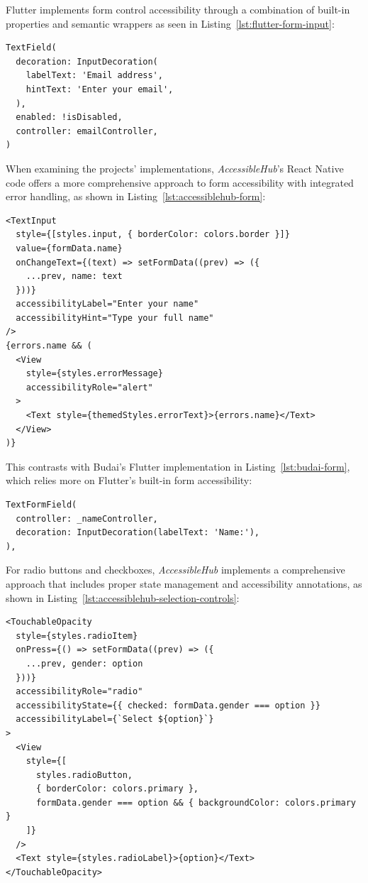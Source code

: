 Flutter implements form control accessibility through a combination of built-in properties and semantic wrappers as seen in Listing~\ref{lst:flutter-form-input}:

\begin{lstlisting}[style=DartStyle, caption=Accessible form input in Flutter, label=lst:flutter-form-input]
TextField(
  decoration: InputDecoration(
    labelText: 'Email address',
    hintText: 'Enter your email',
  ),
  enabled: !isDisabled,
  controller: emailController,
)
\end{lstlisting}

\pagebreak

When examining the projects' implementations, \textit{AccessibleHub}'s React Native code offers a more comprehensive approach to form accessibility with integrated error handling, as shown in Listing~\ref{lst:accessiblehub-form}:

\begin{lstlisting}[style=ReactNativeStyle, caption=Form implementation in AccessibleHub's React Native code, label=lst:accessiblehub-form]
<TextInput
  style={[styles.input, { borderColor: colors.border }]}
  value={formData.name}
  onChangeText={(text) => setFormData((prev) => ({
    ...prev, name: text
  }))}
  accessibilityLabel="Enter your name"
  accessibilityHint="Type your full name"
/>
{errors.name && (
  <View 
    style={styles.errorMessage} 
    accessibilityRole="alert"
  >
    <Text style={themedStyles.errorText}>{errors.name}</Text>
  </View>
)}
\end{lstlisting}

\pagebreak

This contrasts with Budai's Flutter implementation in Listing~\ref{lst:budai-form}, which relies more on Flutter's built-in form accessibility:

\begin{lstlisting}[style=DartStyle, caption=Form implementation in Budai's Flutter code, label=lst:budai-form]
TextFormField(
  controller: _nameController,
  decoration: InputDecoration(labelText: 'Name:'),
),
\end{lstlisting}

For radio buttons and checkboxes, \textit{AccessibleHub} implements a comprehensive approach that includes proper state management and accessibility annotations, as shown in Listing~\ref{lst:accessiblehub-selection-controls}:

\begin{lstlisting}[style=ReactNativeStyle, caption=Selection controls in AccessibleHub, label=lst:accessiblehub-selection-controls]
<TouchableOpacity
  style={styles.radioItem}
  onPress={() => setFormData((prev) => ({ 
    ...prev, gender: option 
  }))}
  accessibilityRole="radio"
  accessibilityState={{ checked: formData.gender === option }}
  accessibilityLabel={`Select ${option}`}
>
  <View
    style={[
      styles.radioButton,
      { borderColor: colors.primary },
      formData.gender === option && { backgroundColor: colors.primary }
    ]}
  />
  <Text style={styles.radioLabel}>{option}</Text>
</TouchableOpacity>
\end{lstlisting}

